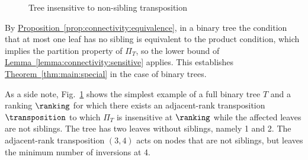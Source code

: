 \documentclass[11pt]{article}
\numberwithin{equation}{section}
\theoremstyle{definition}
\theoremstyle{plain}
\newcommand{\expref}[2]{\hyperref[#2]{#1~\ref{#2}}}
\begin{document}
%
\begin{figure}[ht]
%
    \centering
    \caption{Tree insensitive to non-sibling transposition}
    \label{fig:connectivity:insensitive-binary}
\end{figure}
%

By \expref{Proposition}{prop:connectivity:equivalence}, in a binary tree the condition that at most one leaf has no sibling is equivalent to the product condition, which implies the partition property of $\Pi_T$, so the lower bound of \expref{Lemma}{lemma:connectivity:sensitive} applies. This establishes \expref{Theorem}{thm:main:special} in the case of binary trees. 

As a side note, Fig.~\ref{fig:connectivity:insensitive-binary} shows the simplest example of a full binary tree $T$ and a ranking $\ranking$ for which there exists an adjacent-rank transposition $\transposition$ to which $\Pi_T$ is insensitive at $\ranking$ while the affected leaves are not siblings. The tree has two leaves without siblings, namely 1 and 2. The adjacent-rank transposition $(3,4)$ acts on nodes that are not siblings, but leaves the minimum number of inversions at 4.
\end{document}
